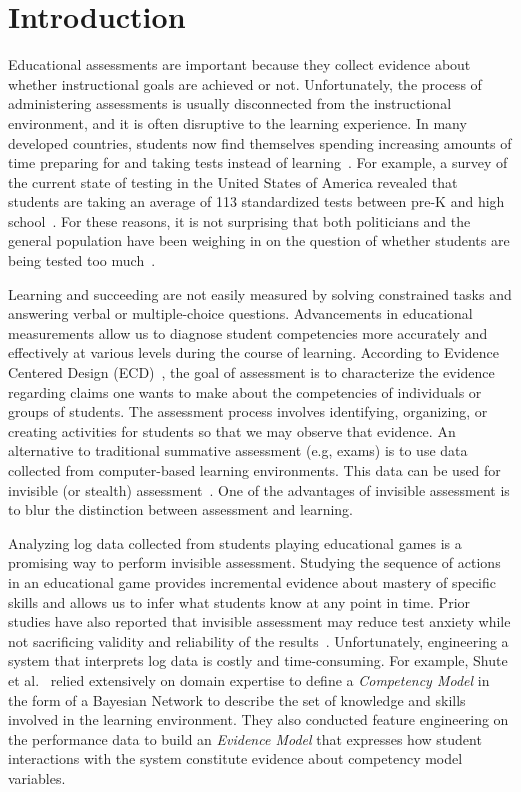 \documentclass{sigchi}
\begin{document}
	
	\section{Introduction}
	Educational assessments are important because they collect evidence about  whether instructional goals are achieved or not.
	Unfortunately, the process of  administering assessments is usually disconnected from the instructional environment, and  it is often  disruptive to the learning experience. 
	In many developed countries, students now find themselves spending increasing amounts of time preparing for and taking tests instead of learning~\cite{hofman2015re}.
	For example, a  survey of the current state of testing in the United States of America revealed that students are taking an average of 113 standardized tests between pre-K and high school~\cite{lazarin2014testing}. 
	For these reasons, it is not surprising that both politicians and the general population have been weighing in on the question of whether students are being tested too much~\cite{lazarin2014testing}.
	
	Learning and succeeding are not easily measured by solving constrained tasks and answering verbal or multiple-choice questions.
	Advancements in educational  measurements allow us to diagnose student competencies more accurately and effectively at various levels during the course of learning.
	According to Evidence Centered Design (ECD)~\cite{mislevy2012design}, the goal of assessment is to characterize the evidence regarding claims one wants to make about the competencies of individuals or groups of students.
	The assessment process involves identifying, organizing, or creating activities for students so that we may observe that evidence.
	An alternative to traditional summative assessment (e.g, exams) is to use data collected from computer-based learning environments.
	This data can be used for invisible (or stealth) assessment~\cite{shute2013stealth}.
	One of the advantages of invisible assessment is to blur the distinction between assessment and learning.
	
	Analyzing log data collected from students playing educational games is a  promising way to perform invisible assessment.
	Studying the sequence of actions in an educational game provides incremental evidence about mastery of specific skills and allows us to infer what students know at any point in time.
	Prior studies have also reported that invisible assessment may reduce test anxiety while not sacrificing validity and reliability of the results~\cite{shute2008you}.
	Unfortunately, engineering a system that interprets log data is costly and time-consuming.
	For example, Shute et al.~\cite{shute2013stealth, shute2009melding} relied extensively on domain expertise to define a \textit{Competency Model} in the form of a Bayesian Network to describe the set of knowledge and skills involved in the learning environment.
	They also conducted feature engineering on the performance data to build an \textit{Evidence Model} that expresses how student interactions with the system constitute evidence about competency model variables.
	
\end{document}
